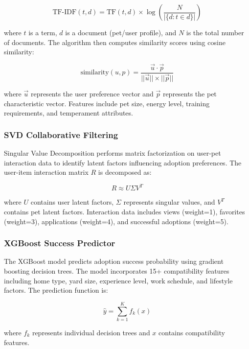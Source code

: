 \documentclass[conference]{IEEEtran}
\begin{document}
\begin{equation}
\text{TF-IDF}(t,d) = \text{TF}(t,d) \times \log\left(\frac{N}{|\{d : t \in d\}|}\right)
\end{equation}

where $t$ is a term, $d$ is a document (pet/user profile), and $N$ is the total number of documents. The algorithm then computes similarity scores using cosine similarity:

\begin{equation}
\text{similarity}(u,p) = \frac{\vec{u} \cdot \vec{p}}{||\vec{u}|| \times ||\vec{p}||}
\end{equation}

where $\vec{u}$ represents the user preference vector and $\vec{p}$ represents the pet characteristic vector. Features include pet size, energy level, training requirements, and temperament attributes.

\subsubsection{SVD Collaborative Filtering}
Singular Value Decomposition performs matrix factorization on user-pet interaction data to identify latent factors influencing adoption preferences. The user-item interaction matrix $R$ is decomposed as:

\begin{equation}
R \approx U\Sigma V^T
\end{equation}

where $U$ contains user latent factors, $\Sigma$ represents singular values, and $V^T$ contains pet latent factors. Interaction data includes views (weight=1), favorites (weight=3), applications (weight=4), and successful adoptions (weight=5).

\subsubsection{XGBoost Success Predictor}
The XGBoost model predicts adoption success probability using gradient boosting decision trees. The model incorporates 15+ compatibility features including home type, yard size, experience level, work schedule, and lifestyle factors. The prediction function is:

\begin{equation}
\hat{y} = \sum_{k=1}^{K} f_k(x)
\end{equation}

where $f_k$ represents individual decision trees and $x$ contains compatibility features.
\end{document}
